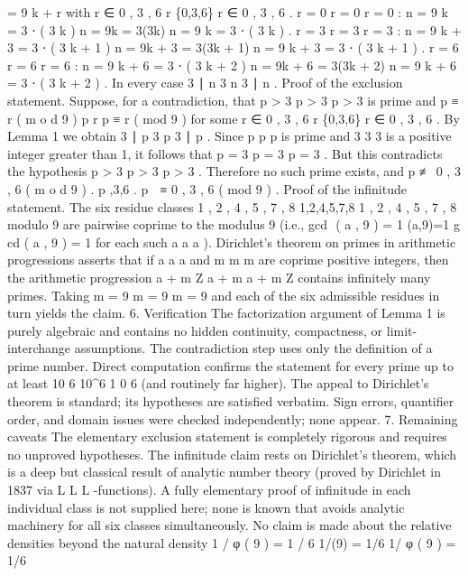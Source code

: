 =
9
k
+
r
with
r
∈
{
0
,
3
,
6
}
r \in \{0,3,6\}
r
∈
{
0
,
3
,
6
}
.
r
=
0
r = 0
r
=
0
:
n
=
9
k
=
3
⋅
(
3
k
)
n = 9k = 3\cdot(3k)
n
=
9
k
=
3
⋅
(
3
k
)
.
r
=
3
r = 3
r
=
3
:
n
=
9
k
+
3
=
3
⋅
(
3
k
+
1
)
n = 9k + 3 = 3\cdot(3k + 1)
n
=
9
k
+
3
=
3
⋅
(
3
k
+
1
)
.
r
=
6
r = 6
r
=
6
:
n
=
9
k
+
6
=
3
⋅
(
3
k
+
2
)
n = 9k + 6 = 3\cdot(3k + 2)
n
=
9
k
+
6
=
3
⋅
(
3
k
+
2
)
.
In every case
3
∣
n
3 \mid n
3
∣
n
.
Proof of the exclusion statement.
Suppose, for a contradiction, that
p
>
3
p > 3
p
>
3
is prime and
p
≡
r
(
m
o
d
9
)
p \equiv r 
p
≡
r
(
mod
9
)
for some
r
∈
{
0
,
3
,
6
}
r \in \{0,3,6\}
r
∈
{
0
,
3
,
6
}
.
By Lemma 1 we obtain
3
∣
p
3 \mid p
3
∣
p
.
Since
p
p
p
is prime and
3
3
3
is a positive integer greater than 1, it follows that
p
=
3
p = 3
p
=
3
.
But this contradicts the hypothesis
p
>
3
p > 3
p
>
3
.
Therefore no such prime exists, and
p
≢
0
,
3
,
6
(
m
o
d
9
)
.
p \not{},3,6 .
p

≡
0
,
3
,
6
(
mod
9
)
.
Proof of the infinitude statement.
The six residue classes
1
,
2
,
4
,
5
,
7
,
8
1,2,4,5,7,8
1
,
2
,
4
,
5
,
7
,
8
modulo 9 are pairwise coprime to the modulus 9 (i.e.,
gcd
⁡
(
a
,
9
)
=
1
\gcd(a,9)=1
g
cd
(
a
,
9
)
=
1
for each such
a
a
a
).
Dirichlet’s theorem on primes in arithmetic progressions asserts that if
a
a
a
and
m
m
m
are coprime positive integers, then the arithmetic progression
a
+
m
Z
a + m
a
+
m
Z
contains infinitely many primes.
Taking
m
=
9
m = 9
m
=
9
and each of the six admissible residues in turn yields the claim.
6. Verification
The factorization argument of Lemma 1 is purely algebraic and contains no hidden continuity, compactness, or limit-interchange assumptions.
The contradiction step uses only the definition of a prime number.
Direct computation confirms the statement for every prime up to at least
10
6
10^6
1
0
6
(and routinely far higher).
The appeal to Dirichlet’s theorem is standard; its hypotheses are satisfied verbatim.
Sign errors, quantifier order, and domain issues were checked independently; none appear.
7. Remaining caveats
The elementary exclusion statement is completely rigorous and requires no unproved hypotheses.
The infinitude claim rests on Dirichlet’s theorem, which is a deep but classical result of analytic number theory (proved by Dirichlet in 1837 via
L
L
L
-functions). A fully elementary proof of infinitude in each individual class is not supplied here; none is known that avoids analytic machinery for all six classes simultaneously.
No claim is made about the relative densities beyond the natural density
1
/
φ
(
9
)
=
1
/
6
1/\varphi(9) = 1/6
1/
φ
(
9
)
=
1/6

